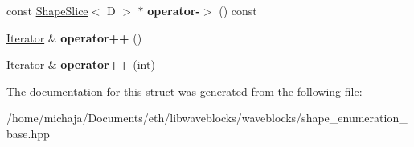 \begin{DoxyCompactItemize}
\item 
\hypertarget{structwaveblocks_1_1_shape_enumeration_1_1_slices_1_1_iterator_a675f74ba92865ead401dc34e508fc7d1}{}const \hyperlink{classwaveblocks_1_1_shape_slice}{Shape\+Slice}$<$ D $>$ $\ast$ {\bfseries operator-\/$>$} () const \label{structwaveblocks_1_1_shape_enumeration_1_1_slices_1_1_iterator_a675f74ba92865ead401dc34e508fc7d1}

\item 
\hypertarget{structwaveblocks_1_1_shape_enumeration_1_1_slices_1_1_iterator_a8b847aa2ee43347544cdd152fb8eea18}{}\hyperlink{structwaveblocks_1_1_shape_enumeration_1_1_slices_1_1_iterator}{Iterator} \& {\bfseries operator++} ()\label{structwaveblocks_1_1_shape_enumeration_1_1_slices_1_1_iterator_a8b847aa2ee43347544cdd152fb8eea18}

\item 
\hypertarget{structwaveblocks_1_1_shape_enumeration_1_1_slices_1_1_iterator_a21b62391685938d0ff3089888d202643}{}\hyperlink{structwaveblocks_1_1_shape_enumeration_1_1_slices_1_1_iterator}{Iterator} \& {\bfseries operator++} (int)\label{structwaveblocks_1_1_shape_enumeration_1_1_slices_1_1_iterator_a21b62391685938d0ff3089888d202643}

\end{DoxyCompactItemize}


The documentation for this struct was generated from the following file\+:\begin{DoxyCompactItemize}
\item 
/home/michaja/\+Documents/eth/libwaveblocks/waveblocks/shape\+\_\+enumeration\+\_\+base.\+hpp\end{DoxyCompactItemize}
